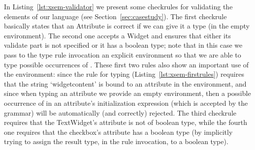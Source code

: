 In Listing~\ref{lst:xsem-validator} we present some checkrules for validating
the elements of our language (see Section~\ref{sec:casestudy}).  The first
checkrule basically states that an Attribute is correct if we can give it a type
(in the empty environment).  The second one accepts a Widget and ensures that
either its validate part is not specified or it has a boolean type; note that in
this case we pass to the type rule invocation an explicit environment so that we
are able to type possible occurrences of .  These first
two rules also show an important use of the environment: since the rule for
typing  (Listing~\ref{lst:xsem-firstrules}) requires that
the string `widgetcontent' is bound to an attribute in the environment, and
since when typing an attribute we provide an empty environment, then a possible
occurrence of  in an attribute's initialization expression
(which is accepted by the grammar) will be automatically (and correctly)
rejected.
The third checkrule requires that the TextWidget's attribute is not of boolean
type, while the fourth one requires that the checkbox's attribute has a boolean
type (by implicitly trying to assign the result type, in the rule invocation, to
a boolean type).
